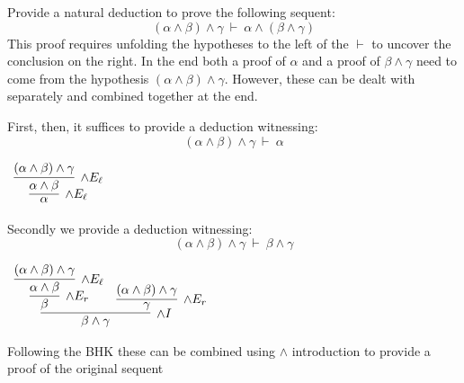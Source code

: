 \documentclass{book}
\begin{document}
    \begin{eg}

        Provide a natural deduction to prove the following sequent: $$(\alpha \land \beta) \land \gamma \ \vdash \ \alpha \land (\beta \land \gamma) $$
        This proof requires unfolding the hypotheses to the left of the $\vdash$ to uncover the conclusion on the right. In the end both a proof of $\alpha$ and a proof of $\beta \land \gamma$ need to come from the hypothesis $(\alpha \land \beta) \land \gamma$. However, these can be dealt with separately and combined together at the end. 

        First, then, it suffices to provide a deduction witnessing: $$(\alpha \land \beta) \land \gamma \ \vdash \ \alpha$$

        \begin{center}
            $\begin{array}{c}
                \infer[\land E_{\ell}]{\alpha}
                    {\infer[\land E_{\ell}]{\alpha \land \beta}
                        {(\alpha \land \beta) \land \gamma}}
            \end{array}$
        \end{center}

        Secondly we provide a deduction witnessing: $$(\alpha \land \beta) \land \gamma \ \vdash \ \beta \land \gamma$$

        \begin{center}
            $\begin{array}{c}
                \infer[\land I]{\beta \land \gamma}
                    {\infer[\land E_{r}]{\beta} 
                        {\infer[\land E_{\ell}]{\alpha \land \beta}
                            {(\alpha \land \beta) \land \gamma}}
                    &
                    \infer[\land E_{r}]{\gamma} 
                        {(\alpha \land \beta) \land \gamma}}
            \end{array}$
        \end{center}

        Following the BHK these can be combined using $\land$ introduction to provide a proof of the original sequent 


\end{eg}
\end{document}
